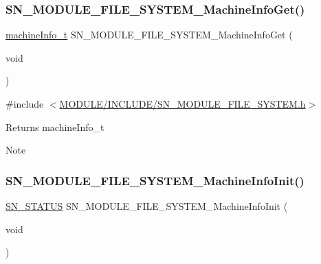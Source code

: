 \subsubsection{\texorpdfstring{S\+N\+\_\+\+M\+O\+D\+U\+L\+E\+\_\+\+F\+I\+L\+E\+\_\+\+S\+Y\+S\+T\+E\+M\+\_\+\+Machine\+Info\+Get()}{SN\_MODULE\_FILE\_SYSTEM\_MachineInfoGet()}}
{\footnotesize\ttfamily \hyperlink{structmachine__information}{machine\+Info\+\_\+t} S\+N\+\_\+\+M\+O\+D\+U\+L\+E\+\_\+\+F\+I\+L\+E\+\_\+\+S\+Y\+S\+T\+E\+M\+\_\+\+Machine\+Info\+Get (\begin{DoxyParamCaption}\item[{void}]{ }\end{DoxyParamCaption})}



{\ttfamily \#include $<$\hyperlink{SN__MODULE__FILE__SYSTEM_8h}{M\+O\+D\+U\+L\+E/\+I\+N\+C\+L\+U\+D\+E/\+S\+N\+\_\+\+M\+O\+D\+U\+L\+E\+\_\+\+F\+I\+L\+E\+\_\+\+S\+Y\+S\+T\+E\+M.\+h}$>$}

\begin{DoxyReturn}{Returns}
machine\+Info\+\_\+t 
\end{DoxyReturn}
\begin{DoxyNote}{Note}

\end{DoxyNote}
\mbox{\label{group__MODULE__FILE__SYSTEM_ga4fba82e15bc9a77407cacaa1a6aadd50}} 
\subsubsection{\texorpdfstring{S\+N\+\_\+\+M\+O\+D\+U\+L\+E\+\_\+\+F\+I\+L\+E\+\_\+\+S\+Y\+S\+T\+E\+M\+\_\+\+Machine\+Info\+Init()}{SN\_MODULE\_FILE\_SYSTEM\_MachineInfoInit()}}
{\footnotesize\ttfamily \hyperlink{group__SYSTEM__ERROR_ga4540713b9a7a18ce44d78c3a10f7442f}{S\+N\+\_\+\+S\+T\+A\+T\+US} S\+N\+\_\+\+M\+O\+D\+U\+L\+E\+\_\+\+F\+I\+L\+E\+\_\+\+S\+Y\+S\+T\+E\+M\+\_\+\+Machine\+Info\+Init (\begin{DoxyParamCaption}\item[{void}]{ }\end{DoxyParamCaption})}



